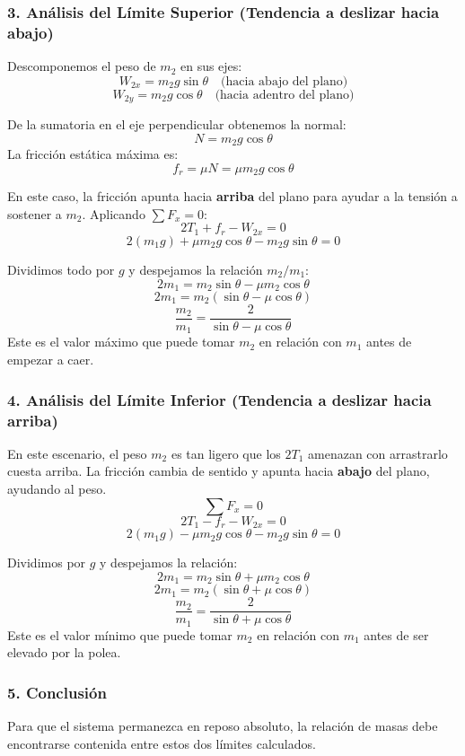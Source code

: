 \documentclass[12pt, a4paper]{article}
\begin{document}
\subsubsection*{3. Análisis del Límite Superior (Tendencia a deslizar hacia abajo)}
Descomponemos el peso de $m_2$ en sus ejes:
$$ W_{2x} = m_2 g \sin\theta \quad \text{(hacia abajo del plano)} $$
$$ W_{2y} = m_2 g \cos\theta \quad \text{(hacia adentro del plano)} $$

De la sumatoria en el eje perpendicular obtenemos la normal:
$$ N = m_2 g \cos\theta $$
La fricción estática máxima es:
$$ f_r = \mu N = \mu m_2 g \cos\theta $$

En este caso, la fricción apunta hacia \textbf{arriba} del plano para ayudar a la tensión a sostener a $m_2$. Aplicando $\sum F_x = 0$:
$$ 2 T_1 + f_r - W_{2x} = 0 $$
$$ 2 (m_1 g) + \mu m_2 g \cos\theta - m_2 g \sin\theta = 0 $$

Dividimos todo por $g$ y despejamos la relación $m_2 / m_1$:
$$ 2 m_1 = m_2 \sin\theta - \mu m_2 \cos\theta $$
$$ 2 m_1 = m_2 (\sin\theta - \mu \cos\theta) $$
$$ \frac{m_2}{m_1} = \frac{2}{\sin\theta - \mu \cos\theta} $$
Este es el valor máximo que puede tomar $m_2$ en relación con $m_1$ antes de empezar a caer.

\subsubsection*{4. Análisis del Límite Inferior (Tendencia a deslizar hacia arriba)}
En este escenario, el peso $m_2$ es tan ligero que los $2T_1$ amenazan con arrastrarlo cuesta arriba. La fricción cambia de sentido y apunta hacia \textbf{abajo} del plano, ayudando al peso.
$$ \sum F_x = 0 $$
$$ 2 T_1 - f_r - W_{2x} = 0 $$
$$ 2 (m_1 g) - \mu m_2 g \cos\theta - m_2 g \sin\theta = 0 $$

Dividimos por $g$ y despejamos la relación:
$$ 2 m_1 = m_2 \sin\theta + \mu m_2 \cos\theta $$
$$ 2 m_1 = m_2 (\sin\theta + \mu \cos\theta) $$
$$ \frac{m_2}{m_1} = \frac{2}{\sin\theta + \mu \cos\theta} $$
Este es el valor mínimo que puede tomar $m_2$ en relación con $m_1$ antes de ser elevado por la polea.

\subsubsection*{5. Conclusión}
Para que el sistema permanezca en reposo absoluto, la relación de masas debe encontrarse contenida entre estos dos límites calculados.
\end{document}
